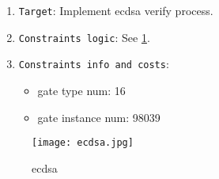 
\begin{enumerate}
    \item \verb|Target|: Implement ecdsa verify process.
    \item \verb|Constraints logic|: See \ref{fig:ecdsa}.
    \item \verb|Constraints info and costs|:
    \begin{itemize}
        \item gate type num: 16
        \item gate instance num: 98039
    \end{itemize}
\end{enumerate}

\begin{figure}[!ht]
    \centering
    \texttt{[image: ecdsa.jpg]}
    \caption{ecdsa}
    \label{fig:ecdsa}
\end{figure}